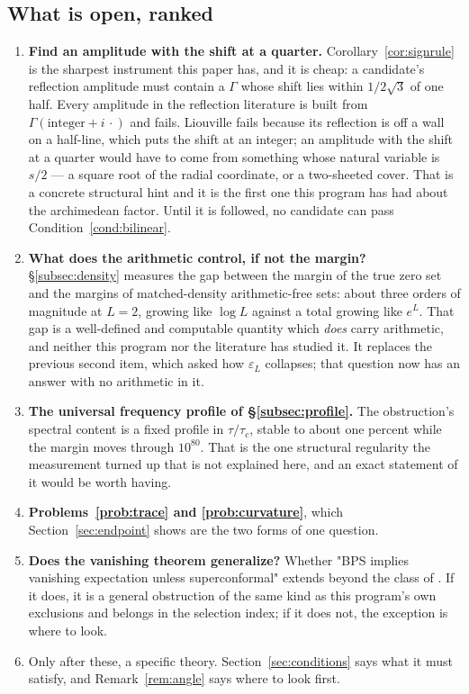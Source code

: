 \subsection{What is open, ranked}

\begin{enumerate}
\item \textbf{Find an amplitude with the shift at a quarter.}
Corollary~\ref{cor:signrule} is the sharpest instrument this paper has, and it is
cheap: a candidate's reflection amplitude must contain a $\Gamma$ whose shift lies
within $1/2\sqrt3$ of one half. Every amplitude in the reflection literature is
built from $\Gamma(\text{integer}+i\,\cdot)$ and fails. Liouville fails because
its reflection is off a wall on a half-line, which puts the shift at an integer;
an amplitude with the shift at a quarter would have to come from something whose
natural variable is $s/2$ --- a square root of the radial coordinate, or a
two-sheeted cover. That is a concrete structural hint and it is the first one this
program has had about the archimedean factor. Until it is followed, no candidate
can pass Condition~\ref{cond:bilinear}.

\item \textbf{What does the arithmetic control, if not the margin?}
\S\ref{subsec:density} measures the gap between the margin of the true zero set
and the margins of matched-density arithmetic-free sets: about three orders of
magnitude at $L=2$, growing like $\log L$ against a total growing like $e^L$. That
gap is a well-defined and computable quantity which \emph{does} carry arithmetic,
and neither this program nor the literature has studied it. It replaces the
previous second item, which asked how $\varepsilon_L$ collapses; that question now
has an answer with no arithmetic in it.

\item \textbf{The universal frequency profile of \S\ref{subsec:profile}.} The
obstruction's spectral content is a fixed profile in $\tau/\tau_c$, stable to about
one percent while the margin moves through $10^{80}$. That is the one structural
regularity the measurement turned up that is not explained here, and an exact
statement of it would be worth having.

\item \textbf{Problems~\ref{prob:trace} and \ref{prob:curvature}}, which
Section~\ref{sec:endpoint} shows are the two forms of one question.

\item \textbf{Does the vanishing theorem generalize?} Whether "BPS implies
vanishing expectation unless superconformal" extends beyond the class of
\cite{OWL}. If it does, it is a general obstruction of the same kind as this
program's own exclusions and belongs in the selection index; if it does not, the
exception is where to look.

\item Only after these, a specific theory. Section~\ref{sec:conditions} says what
it must satisfy, and Remark~\ref{rem:angle} says where to look first.
\end{enumerate}

